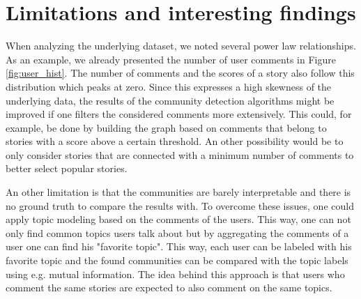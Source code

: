 \documentclass[sigconf]{acmart}
\begin{document}





\section{Limitations and interesting findings}

When analyzing the underlying dataset, we noted several power law relationships.
As an example, we already presented the number of user comments in Figure \ref{fig:user_hist}.
The number of comments and the scores of a story also follow this distribution which peaks at zero.
Since this expresses a high skewness of the underlying data, the results of the community detection algorithms might be improved if one filters the considered comments more extensively.
This could, for example, be done by building the graph based on comments that belong to stories with a score above a certain threshold.
An other possibility would be to only consider stories that are connected with a minimum number of comments to better select popular stories.

An other limitation is that the communities are barely interpretable and there is no ground truth to compare the results with.
To overcome these issues, one could apply topic modeling based on the comments of the users.
This way, one can not only find common topics users talk about but by aggregating the comments of a user one can find his "favorite topic".
This way, each user can be labeled with his favorite topic and the found communities can be compared with the topic labels using e.g. mutual information\cite{cover1991information}.
The idea behind this approach is that users who comment the same stories are expected to also comment on the same topics.
\end{document}

